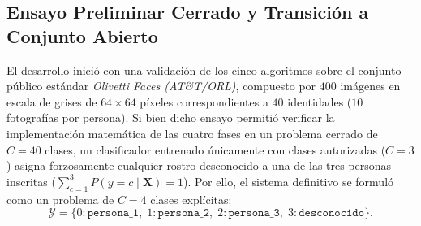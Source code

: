 \documentclass{article}
\begin{document}
\subsection{Ensayo Preliminar Cerrado y Transición a Conjunto Abierto}
El desarrollo inició con una validación de los cinco algoritmos sobre el conjunto público estándar \textit{Olivetti Faces (AT\&T/ORL)}, compuesto por $400$ imágenes en escala de grises de $64 \times 64$ píxeles correspondientes a $40$ identidades ($10$ fotografías por persona). Si bien dicho ensayo permitió verificar la implementación matemática de las cuatro fases en un problema cerrado de $C = 40$ clases, un clasificador entrenado únicamente con clases autorizadas ($C = 3$) asigna forzosamente cualquier rostro desconocido a una de las tres personas inscritas ($\sum_{c=1}^3 P(y=c \mid \mathbf{X}) = 1$). Por ello, el sistema definitivo se formuló como un problema de $C = 4$ clases explícitas:
\begin{equation}
\mathcal{Y} = \{0: \texttt{persona\_1},\; 1: \texttt{persona\_2},\; 2: \texttt{persona\_3},\; 3: \texttt{desconocido}\}.
\end{equation}
\end{document}
